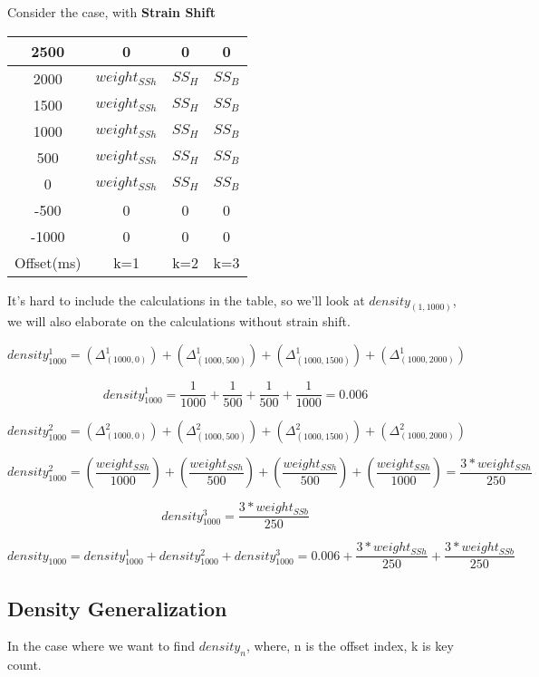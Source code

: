 \documentclass{article}
\begin{document}
Consider the case, with \textbf{Strain Shift}
\begin{center}
	\begin{tabular}{|c|c|c|c|} 
	\hline
	2500 & 0			  & 0 		& 0 	\\ \hline
	2000 & $weight_{SSh}$ & $SS_H$ 	& $SS_B$\\	\hline
	1500 & $weight_{SSh}$ & $SS_H$ 	& $SS_B$\\	\hline
	1000 & $weight_{SSh}$ & $SS_H$ 	& $SS_B$\\	\hline
	 500 & $weight_{SSh}$ & $SS_H$ 	& $SS_B$\\	\hline
	   0 & $weight_{SSh}$ & $SS_H$ 	& $SS_B$\\	\hline
    -500 & 0			  & 0 		& 0 	\\	\hline
   -1000 & 0			  & 0 		& 0 	\\
	\hline
	Offset(ms) & k=1 & k=2 & k=3\\ 
	\hline
\end{tabular}
\end{center}

It's hard to include the calculations in the table, so we'll look at $density_{(1,1000)}$, we will also elaborate on the calculations without strain shift.

$$density_{1000}^1 =
(\Delta_{(1000,0)}^{1}) +
(\Delta_{(1000,500)}^{1}) +
(\Delta_{(1000,1500)}^{1}) +
(\Delta_{(1000,2000)}^{1})$$

$$density_{1000}^1 =
\frac{1}{1000} +
\frac{1}{500} +
\frac{1}{500} +
\frac{1}{1000} = 0.006$$

$$density_{1000}^2 = 
(\Delta_{(1000,0)}^{2}) +
(\Delta_{(1000,500)}^{2}) +
(\Delta_{(1000,1500)}^{2}) +
(\Delta_{(1000,2000)}^{2})$$

$$ density_{1000}^2 = 
(\frac{weight_{SSh}}{1000}) +
(\frac{weight_{SSh}}{500}) +
(\frac{weight_{SSh}}{500}) +
(\frac{weight_{SSh}}{1000}) =
\frac{3 * weight_{SSh}}{250} $$

$$ density_{1000}^3 =
\frac{3 * weight_{SSb}}{250} $$

$$ density_{1000} =
density_{1000}^1 + density_{1000}^2 + density_{1000}^3 =
0.006 +
\frac{3 * weight_{SSh}}{250} + \frac{3 * weight_{SSb}}{250} $$

\subsection{Density Generalization}

In the case where we want to find $density_n$, where, n is the offset index, k is key count.
\end{document}
